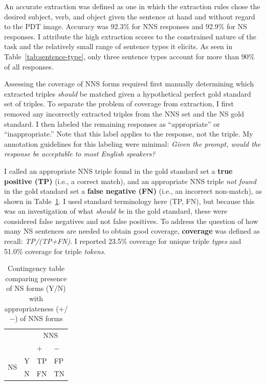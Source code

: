 An accurate extraction was defined as one in which the extraction rules chose the desired subject, verb, and object given the sentence at hand and without regard to the PDT image. Accuracy was 92.3\% for NNS responses and 92.9\% for NS responses. I attribute the high extraction scores to the constrained nature of the task and the relatively small range of sentence types it elicits. As seen in Table~\ref{tab:sentence-type}, only three sentence types account for more than 90\% of all responses. 

Assessing the coverage of NNS forms required first manually determining which extracted triples \textit{should} be matched given a hypothetical perfect gold standard set of triples. To separate the problem of coverage from extraction, I first removed any incorrectly extracted triples from the NNS set and the NS gold standard. I then labeled the remaining responses as ``appropriate'' or ``inappropriate.'' Note that this label applies to the response, not the triple. My annotation guidelines for this labeling were minimal: \textit{Given the prompt, would the response be acceptable to most English speakers?} 

I called an appropriate NNS triple found in the gold standard set a \textbf{true positive (TP)} (i.e., a correct match), and an appropriate NNS triple \textit{not found} in the gold standard set a \textbf{false negative (FN)} (i.e., an incorrect non-match), as shown in Table~\ref{tab:contingencies}. I used standard terminology here (TP, FN), but because this was an investigation of what \emph{should be} in the gold standard, these were considered
false negatives and not false positives.  To address the question of
how many NS sentences are needed to obtain good coverage, \textbf{coverage} was defined as recall: \textit{TP/(TP+FN)}. I reported 23.5\% coverage for unique triple \textit{types} and 51.0\% coverage for triple \textit{tokens}.

\begin{table}[htb!]
\begin{center}
\begin{tabular}{|ll||l|l|}
  \hline
  & & \multicolumn{2}{c|}{NNS}\\
  & & $+$ & $-$ \\
  \hline
  \hline
  \multirow{2}{*}{NS} & Y & TP & FP \\
  \cline{2-4}
  & N & FN & TN\\
  \hline
\end{tabular}
\end{center}
\caption{Contingency table comparing presence of NS forms (Y/N) with
  appropriateness ($+$/$-$) of NNS forms}
\label{tab:contingencies}
\end{table}

